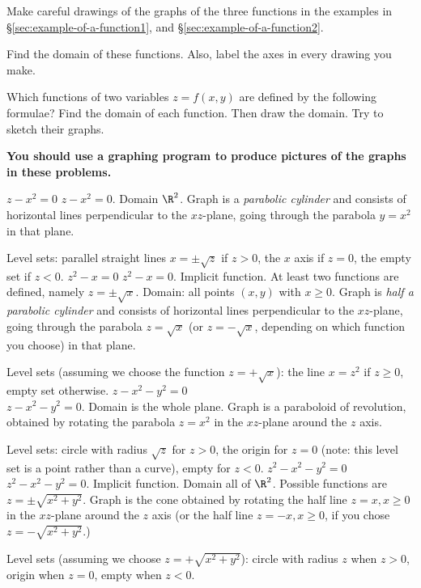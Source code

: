 \problem  Make careful drawings of the graphs of the three functions
in the examples in \S\ref{sec:example-of-a-function1}, and
\S\ref{sec:example-of-a-function2}.


Find the domain of these functions.  Also, label the axes in every drawing
you make.

\problem\label{prb:some-functions}
Which functions of two variables $z=f(x, y)$ are defined by the
following formulae?  Find the domain of each function.  Then draw the
domain.  Try to sketch their graphs.  

\answer
\textbf{You should use a graphing program to produce pictures
of the graphs in these problems.}
\endanswer

\subprob $z-x^2=0$\hspace{7em}
\answer
$z-x^2=0$.
Domain $\R^2$.  Graph is a \emph{parabolic cylinder} and consists of
horizontal lines perpendicular to the $xz$-plane, going through the
parabola $y=x^2$ in that plane.

Level sets: parallel straight lines $x=\pm\sqrt{z}$ if $z>0$,
the $x$ axis if $z=0$, the empty set if $z<0$.
\endanswer
\subprob $z^2-x=0$\hspace{7em}
\answer
$z^2-x=0$.
Implicit function.
At least two functions are defined, namely $z=\pm \sqrt{x}$. 
Domain: all points $(x,y)$ with $x\ge 0$.
Graph is \emph{half a parabolic cylinder} and consists of
horizontal lines perpendicular to the $xz$-plane, going through the
parabola $z=\sqrt x$ (or $z=-\sqrt x$, depending on which function
you choose) in that plane.

Level sets (assuming we choose the function $z=+\sqrt{x}$):
the line $x=z^2$ if $z\ge0$, empty set otherwise.
\endanswer
\subprob $z-x^2-y^2=0$\\
\answer
$z-x^2-y^2=0$.
Domain is the whole plane.
Graph is a paraboloid of revolution, obtained by rotating the
parabola $z=x^2$ in the $xz$-plane around the $z$ axis.

Level sets: circle with radius $\sqrt{z}$ for $z>0$,
the origin for $z=0$ (note: this level set is a point rather than a curve),
empty for $z<0$.
\endanswer
\subprob $z^2-x^2-y^2=0$
\answer
$z^2-x^2-y^2=0$.
Implicit function.  Domain all of $\R^2$.
Possible functions are $z=\pm\sqrt{x^2+y^2}$.
Graph is the cone obtained by rotating the
half line $z=x, x\geq0$ in the $xz$-plane around the $z$ axis
(or the half line $z=-x, x\geq0$, if you chose $z=-\sqrt{x^2+y^2}$.)

Level sets (assuming we choose $z=+\sqrt{x^2+y^2}$):  circle with radius
$z$ when $z>0$, origin when $z=0$, empty when $z<0$.

